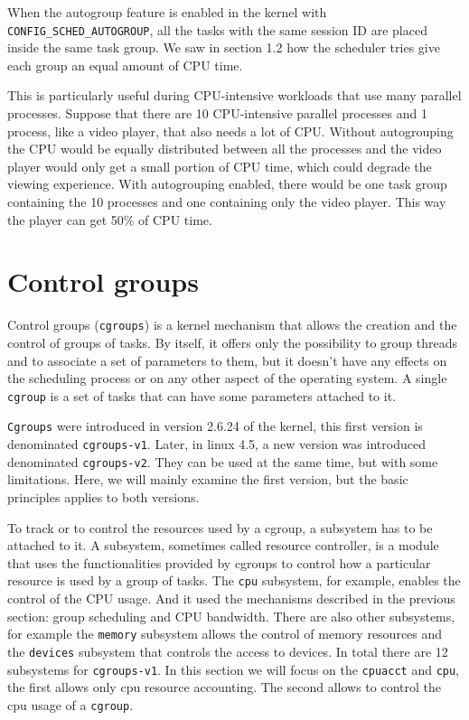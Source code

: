 When the autogroup feature is enabled in the kernel with \verb|CONFIG_SCHED_AUTOGROUP|, all the tasks with the same session ID are placed inside the same task group. We saw in section 1.2 how the scheduler tries give each group an equal amount of CPU time.

This is particularly useful during CPU-intensive workloads that use many parallel processes. Suppose that there are 10 CPU-intensive parallel processes and 1 process, like a video player, that also needs a lot of CPU. Without autogrouping the CPU would be equally distributed between all the processes and  the video player would only get a small portion of CPU time, which could degrade the viewing experience. With autogrouping enabled, there would be one task group containing the 10 processes and one containing only the video player. This way the player can get 50\% of CPU time.



\section{Control groups}
\label{sec:cgroup}

Control groups (\verb|cgroups|) is a kernel mechanism that allows the creation and the control of groups of tasks. By itself, it offers only the possibility to group threads and to associate a set of parameters to them, but it doesn't have any effects on the scheduling process or on any other aspect of the operating system. A single \verb|cgroup| is a set of tasks that can have some parameters attached to it. 

\verb|Cgroups| were introduced in version 2.6.24 of the kernel, this first version is denominated \verb|cgroups-v1|. Later, in linux 4.5, a new version was introduced denominated \verb|cgroups-v2|. They can be used at the same time, but with some limitations. Here, we will mainly examine the first version, but the basic principles applies to both versions.

To track or to control the resources used by a cgroup, a subsystem has to be attached to it. A subsystem, sometimes called resource controller, is a module that uses the functionalities provided by cgroups to control how a particular resource is used by a group of tasks. The \verb|cpu| subsystem, for example, enables the control of the CPU usage. And it used the mechanisms described in the previous section: group scheduling and CPU bandwidth. There are also other subsystems, for example the \verb|memory| subsystem allows the control of memory resources and the \verb|devices| subsystem that controls the access to devices. In total there are 12 subsystems for \verb|cgroups-v1|. In this section we will focus on the \verb|cpuacct| and \verb|cpu|, the first allows only cpu resource accounting. The second allows to control the cpu usage of a \verb|cgroup|.

